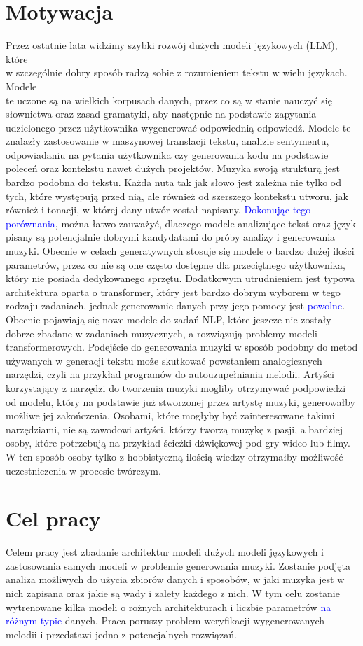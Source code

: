 \documentclass[data-science]{agh-wi} %
\begin{document}
\section{Motywacja}
Przez ostatnie lata widzimy szybki rozwój dużych modeli językowych (LLM), które\\ w szczególnie dobry sposób radzą sobie z rozumieniem tekstu w wielu językach. Modele\\ te uczone są na wielkich korpusach danych, przez co są w stanie nauczyć się słownictwa oraz zasad gramatyki, aby następnie na podstawie zapytania udzielonego przez użytkownika wygenerować odpowiednią odpowiedź. Modele te znalazły zastosowanie w maszynowej translacji tekstu, analizie sentymentu, odpowiadaniu na pytania użytkownika czy generowania kodu na podstawie poleceń oraz kontekstu nawet dużych projektów. Muzyka swoją strukturą jest bardzo podobna do tekstu. Każda nuta tak jak słowo jest zależna nie tylko od tych, które występują przed nią, ale również od szerszego kontekstu utworu, jak również i tonacji, w której dany utwór został napisany. \textcolor{blue}{Dokonując tego porównania}, można łatwo zauważyć, dlaczego modele analizujące tekst oraz język pisany są potencjalnie dobrymi kandydatami do próby analizy i generowania muzyki. Obecnie w celach generatywnych stosuje się modele o bardzo dużej ilości parametrów, przez co nie są one często dostępne dla przeciętnego użytkownika, który nie posiada dedykowanego sprzętu. Dodatkowym utrudnieniem jest typowa architektura oparta o transformer, który jest bardzo dobrym wyborem w tego rodzaju zadaniach, jednak generowanie danych przy jego pomocy jest \textcolor{blue}{powolne}. Obecnie pojawiają się nowe modele do zadań NLP, które jeszcze nie zostały dobrze zbadane w zadaniach muzycznych, a rozwiązują problemy modeli transformerowych. Podejście do generowania muzyki w sposób podobny do metod używanych w generacji tekstu może skutkować powstaniem analogicznych narzędzi, czyli na przykład programów do autouzupełniania  melodii. Artyści korzystający z narzędzi do tworzenia muzyki mogliby otrzymywać podpowiedzi od modelu, który na podstawie już stworzonej przez artystę muzyki, generowałby możliwe jej zakończenia. Osobami, które mogłyby być zainteresowane takimi narzędziami, nie są zawodowi artyści, którzy tworzą muzykę z pasji, a bardziej osoby, które potrzebują na przykład ścieżki dźwiękowej pod gry wideo lub filmy. W ten sposób osoby tylko z hobbistyczną ilością wiedzy otrzymałby możliwość uczestniczenia w procesie twórczym.
\section{Cel pracy}
Celem pracy jest zbadanie architektur modeli dużych modeli językowych i zastosowania samych modeli w problemie generowania muzyki. Zostanie podjęta analiza możliwych do użycia zbiorów danych i sposobów, w jaki muzyka jest w nich zapisana oraz jakie są wady i zalety każdego z nich. W tym celu zostanie wytrenowane kilka modeli o rożnych architekturach i liczbie parametrów \textcolor{blue}{na różnym typie} danych. Praca poruszy problem weryfikacji wygenerowanych melodii i przedstawi jedno z potencjalnych rozwiązań.
\end{document}
